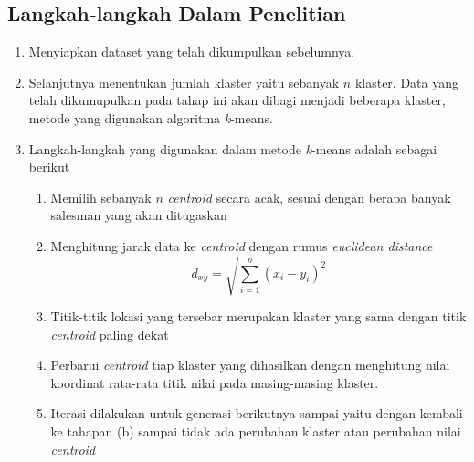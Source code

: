 \subsection{Langkah-langkah Dalam Penelitian}
\begin{enumerate}
    \item Menyiapkan dataset yang telah dikumpulkan sebelumnya.
    \item Selanjutnya menentukan jumlah klaster yaitu sebanyak $n$ klaster. Data yang telah dikumupulkan pada tahap ini akan dibagi menjadi beberapa klaster, metode yang digunakan algoritma \textit{k}-means.
    \item Langkah-langkah yang digunakan dalam metode \textit{k}-means adalah sebagai berikut
    \begin{enumerate}
        \item Memilih sebanyak $n$ \textit{centroid} secara acak, sesuai dengan berapa banyak salesman yang akan ditugaskan
        \item Menghitung jarak data ke \textit{centroid} dengan rumus \textit{euclidean distance}
        \begin{equation}
        d_{xy}=\sqrt{\sum_{i=1}^{n}(x_i-y_i)^{2}}
        \end{equation}
        \item Titik-titik lokasi yang tersebar merupakan klaster yang sama dengan titik \textit{centroid} paling dekat
        \item Perbarui \textit{centroid} tiap klaster yang dihasilkan dengan menghitung nilai koordinat rata-rata titik nilai pada masing-masing klaster.
        \item Iterasi dilakukan untuk generasi berikutnya sampai yaitu dengan kembali ke tahapan (b) sampai tidak ada perubahan klaster atau perubahan nilai \textit{centroid}
    \end{enumerate}
	

\end{enumerate}
